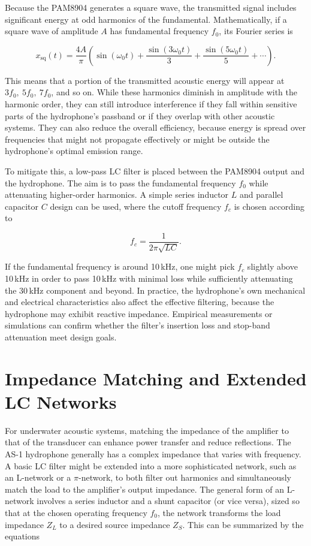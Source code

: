 Because the PAM8904 generates a square wave, the transmitted signal includes significant energy at odd harmonics of the fundamental. Mathematically, if a square wave of amplitude \(A\) has fundamental frequency \(f_0\), its Fourier series is

\[
x_{\text{sq}}(t) = \frac{4A}{\pi} 
\left(\sin(\omega_0 t) + \frac{\sin(3\omega_0 t)}{3} + \frac{\sin(5\omega_0 t)}{5} + \cdots \right).
\]

This means that a portion of the transmitted acoustic energy will appear at \(3f_0,\ 5f_0,\ 7f_0\), and so on. While these harmonics diminish in amplitude with the harmonic order, they can still introduce interference if they fall within sensitive parts of the hydrophone's passband or if they overlap with other acoustic systems. They can also reduce the overall efficiency, because energy is spread over frequencies that might not propagate effectively or might be outside the hydrophone's optimal emission range.

To mitigate this, a low-pass LC filter is placed between the PAM8904 output and the hydrophone. The aim is to pass the fundamental frequency \(f_0\) while attenuating higher-order harmonics. A simple series inductor \(L\) and parallel capacitor \(C\) design can be used, where the cutoff frequency \(f_c\) is chosen according to

\[
f_c = \frac{1}{2\pi \sqrt{LC}}.
\]

If the fundamental frequency is around 10\,kHz, one might pick \(f_c\) slightly above 10\,kHz in order to pass 10\,kHz with minimal loss while sufficiently attenuating the 30\,kHz component and beyond. In practice, the hydrophone's own mechanical and electrical characteristics also affect the effective filtering, because the hydrophone may exhibit reactive impedance. Empirical measurements or simulations can confirm whether the filter's insertion loss and stop-band attenuation meet design goals.

\section{Impedance Matching and Extended LC Networks}

For underwater acoustic systems, matching the impedance of the amplifier to that of the transducer can enhance power transfer and reduce reflections. The AS-1 hydrophone generally has a complex impedance that varies with frequency. A basic LC filter might be extended into a more sophisticated network, such as an L-network or a \(\pi\)-network, to both filter out harmonics and simultaneously match the load to the amplifier's output impedance. The general form of an L-network involves a series inductor and a shunt capacitor (or vice versa), sized so that at the chosen operating frequency \(f_0\), the network transforms the load impedance \(Z_L\) to a desired source impedance \(Z_S\). This can be summarized by the equations

